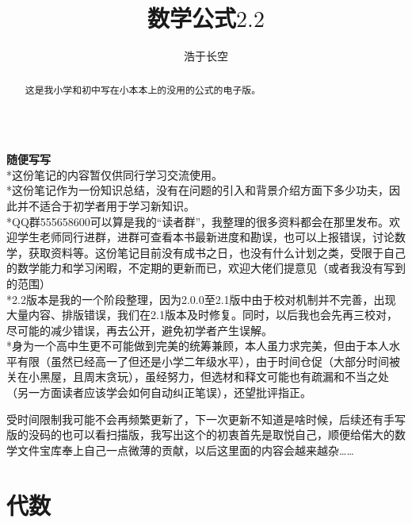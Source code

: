 \documentclass[UTF8]{ctexart}
\begin{document}
\title{数学公式$2.2$}
\author{浩于长空}


\maketitle

\begin{displaymath}
\end{displaymath}

\begin{abstract}
这是我小学和初中写在小本本上的没用的公式的电子版。
\end{abstract}

\newpage

\textbf{随便写写}\\

*这份笔记的内容暂仅供同行学习交流使用。\\

*这份笔记作为一份知识总结，没有在问题的引入和背景介绍方面下多少功夫，因此并不适合于初学者用于学习新知识。\\

*QQ群555658600可以算是我的“读者群”，我整理的很多资料都会在那里发布。欢迎学生老师同行进群，进群可查看本书最新进度和勘误，也可以上报错误，讨论数学，获取资料等。这份笔记目前没有成书之日，也没有什么计划之类，受限于自己的数学能力和学习闲暇，不定期的更新而已，欢迎大佬们提意见（或者我没有写到的范围）\\

*2.2版本是我的一个阶段整理，因为2.0.0至2.1版中由于校对机制并不完善，出现大量内容、排版错误，我们在2.1版本及时修复。同时，以后我也会先再三校对，尽可能的减少错误，再去公开，避免初学者产生误解。
\\

*身为一个高中生更不可能做到完美的统筹兼顾，本人虽力求完美，但由于本人水平有限（虽然已经高一了但还是小学二年级水平），由于时间仓促（大部分时间被关在小黑屋，且周末贪玩），虽经努力，但选材和释文可能也有疏漏和不当之处（另一方面读者应该学会如何自动纠正笔误），还望批评指正。

受时间限制我可能不会再频繁更新了，下一次更新不知道是啥时候，后续还有手写版的没码的也可以看扫描版，我写出这个的初衷首先是取悦自己，顺便给偌大的数学文件宝库奉上自己一点微薄的贡献，以后这里面的内容会越来越杂……
\\

\newpage

\tableofcontents

\newpage

\section{代数} 
\end{document}
